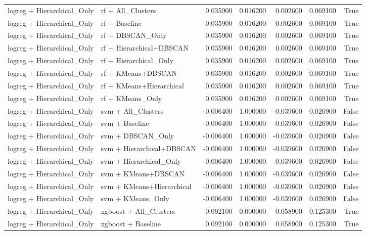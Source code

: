 \begin{tabular}{llrrrrr}
logreg + Hierarchical_Only & rf + All_Clusters & 0.035900 & 0.016200 & 0.002600 & 0.069100 & True \\
logreg + Hierarchical_Only & rf + Baseline & 0.035900 & 0.016200 & 0.002600 & 0.069100 & True \\
logreg + Hierarchical_Only & rf + DBSCAN_Only & 0.035900 & 0.016200 & 0.002600 & 0.069100 & True \\
logreg + Hierarchical_Only & rf + Hierarchical+DBSCAN & 0.035900 & 0.016200 & 0.002600 & 0.069100 & True \\
logreg + Hierarchical_Only & rf + Hierarchical_Only & 0.035900 & 0.016200 & 0.002600 & 0.069100 & True \\
logreg + Hierarchical_Only & rf + KMeans+DBSCAN & 0.035900 & 0.016200 & 0.002600 & 0.069100 & True \\
logreg + Hierarchical_Only & rf + KMeans+Hierarchical & 0.035900 & 0.016200 & 0.002600 & 0.069100 & True \\
logreg + Hierarchical_Only & rf + KMeans_Only & 0.035900 & 0.016200 & 0.002600 & 0.069100 & True \\
logreg + Hierarchical_Only & svm + All_Clusters & -0.006400 & 1.000000 & -0.039600 & 0.026900 & False \\
logreg + Hierarchical_Only & svm + Baseline & -0.006400 & 1.000000 & -0.039600 & 0.026900 & False \\
logreg + Hierarchical_Only & svm + DBSCAN_Only & -0.006400 & 1.000000 & -0.039600 & 0.026900 & False \\
logreg + Hierarchical_Only & svm + Hierarchical+DBSCAN & -0.006400 & 1.000000 & -0.039600 & 0.026900 & False \\
logreg + Hierarchical_Only & svm + Hierarchical_Only & -0.006400 & 1.000000 & -0.039600 & 0.026900 & False \\
logreg + Hierarchical_Only & svm + KMeans+DBSCAN & -0.006400 & 1.000000 & -0.039600 & 0.026900 & False \\
logreg + Hierarchical_Only & svm + KMeans+Hierarchical & -0.006400 & 1.000000 & -0.039600 & 0.026900 & False \\
logreg + Hierarchical_Only & svm + KMeans_Only & -0.006400 & 1.000000 & -0.039600 & 0.026900 & False \\
logreg + Hierarchical_Only & xgboost + All_Clusters & 0.092100 & 0.000000 & 0.058900 & 0.125300 & True \\
logreg + Hierarchical_Only & xgboost + Baseline & 0.092100 & 0.000000 & 0.058900 & 0.125300 & True \\

\end{tabular}
